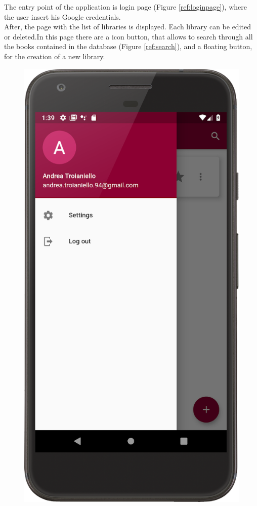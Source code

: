 The entry point of the application is login page (Figure \ref{ref:loginpage}), 
where the user insert his Google credentials.\\ 
After, the page with the list of libraries is displayed. 
Each library can be edited or deleted.In this page there are a icon button, 
that allows to search through all the books contained in the database (Figure \ref{ref:search}), 
and a floating button, for the creation of a new library.\\
\clearpage
\begin{figure}[!htb]
    \begin{minipage}[b]{0.3\textwidth}
        \centering
        \includegraphics[scale=1]{images/menu.png}

\end{minipage}
\end{figure}

